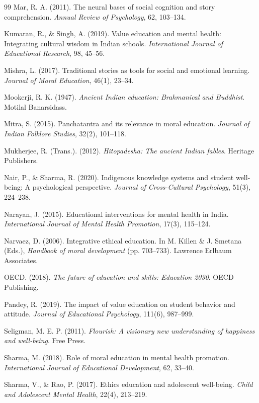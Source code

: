 \documentclass[12pt,a4paper,twocolumn]{article}
\begin{document}
\begin{thebibliography}{99}
Mar, R. A. (2011). The neural bases of social cognition and story comprehension. \textit{Annual Review of Psychology}, 62, 103--134.

Kumaran, R., \& Singh, A. (2019). Value education and mental health: Integrating cultural wisdom in Indian schools. \textit{International Journal of Educational Research}, 98, 45--56.

Mishra, L. (2017). Traditional stories as tools for social and emotional learning. \textit{Journal of Moral Education}, 46(1), 23--34.

Mookerji, R. K. (1947). \textit{Ancient Indian education: Brahmanical and Buddhist}. Motilal Banarsidass.

Mitra, S. (2015). Panchatantra and its relevance in moral education. \textit{Journal of Indian Folklore Studies}, 32(2), 101--118.

Mukherjee, R. (Trans.). (2012). \textit{Hitopadesha: The ancient Indian fables}. Heritage Publishers.

Nair, P., \& Sharma, R. (2020). Indigenous knowledge systems and student well-being: A psychological perspective. \textit{Journal of Cross-Cultural Psychology}, 51(3), 224--238.

Narayan, J. (2015). Educational interventions for mental health in India. \textit{International Journal of Mental Health Promotion}, 17(3), 115--124.

Narvaez, D. (2006). Integrative ethical education. In M. Killen \& J. Smetana (Eds.), \textit{Handbook of moral development} (pp. 703--733). Lawrence Erlbaum Associates.

OECD. (2018). \textit{The future of education and skills: Education 2030}. OECD Publishing.

Pandey, R. (2019). The impact of value education on student behavior and attitude. \textit{Journal of Educational Psychology}, 111(6), 987--999.

Seligman, M. E. P. (2011). \textit{Flourish: A visionary new understanding of happiness and well-being}. Free Press.

Sharma, M. (2018). Role of moral education in mental health promotion. \textit{International Journal of Educational Development}, 62, 33--40.

Sharma, V., \& Rao, P. (2017). Ethics education and adolescent well-being. \textit{Child and Adolescent Mental Health}, 22(4), 213--219.


\end{thebibliography}
\end{document}
